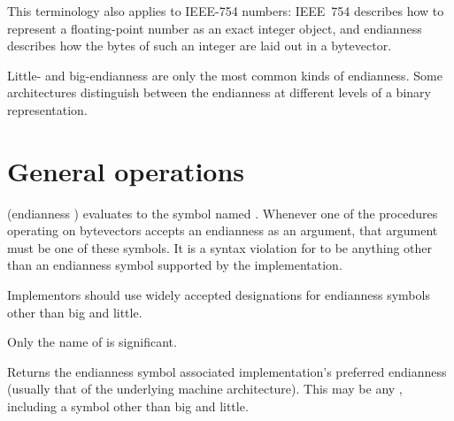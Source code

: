 This terminology also applies to IEEE-754 numbers: IEEE~754 describes
how to represent a floating-point number as an exact integer object, and
endianness describes how the bytes of such an integer are laid out in
a bytevector.

\begin{note}
  Little- and big-endianness are only the most common kinds of
  endianness.  Some architectures distinguish between the endianness
  at different levels of a binary representation.
\end{note}

\section{General operations}

\begin{entry}{%
}

  {\cf (endianness )} evaluates to
the symbol named .  Whenever one of the
procedures operating on bytevectors accepts an endianness as an
argument, that argument must be one of these symbols.  It is a syntax
violation for  to be anything other than an
endianness symbol supported by the implementation.

\begin{note}
  Implementors should use widely accepted designations
  for endianness symbols other than {\cf big} and {\cf little}.
\end{note}

\begin{note}
  Only the name of  is significant.
\end{note}
\end{entry}

\begin{entry}{%
}

Returns the endianness symbol associated implementation's preferred
endianness (usually that of the underlying machine architecture).
This may be any , including a symbol other
than {\cf big} and {\cf little}.
\end{entry}   

